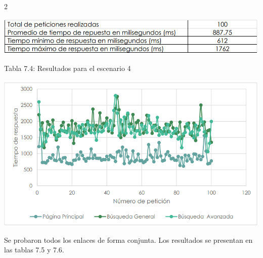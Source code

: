 \documentclass[12pt,spanish,Letterpaper,openany]{book}
\begin{document}
\begin {multicols}{2}
\begin {center}

\noindent\begin{minipage}[c]{\columnwidth}
\centering

\begin{center}\includegraphics[width=1\linewidth]{images/05_10} \end{center}
\vspace{0.01cm}
\footnotesize
\centering

Tabla 7.4: Resultados para el escenario 4

\end{minipage}

\end {center}

\begin {flushleft}
\noindent\begin{minipage}[c]{\columnwidth}

\includegraphics[width=1\linewidth]{images/05_11}

\end{minipage}

\end {flushleft}

Se probaron todos los enlaces de forma conjunta. Los resultados se presentan en las tablas 7.5 y 7.6.

\begin {center}

\noindent\begin{minipage}[c]{\columnwidth}
\centering


\end{minipage}
\end{center}
\end{multicols}
\end{document}

